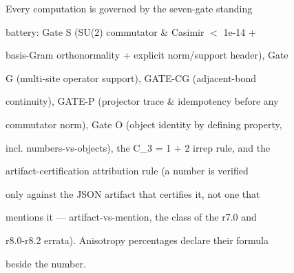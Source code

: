 \documentclass[11pt,a4paper]{article}
\theoremstyle{definition}
\begin{document}
Every computation is governed by the seven-gate standing

battery: Gate S (SU(2) commutator \& Casimir $<$ 1e-14 +

basis-Gram orthonormality + explicit norm/support header), Gate

G (multi-site operator support), GATE-CG (adjacent-bond

continuity), GATE-P (projector trace \& idempotency before any

commutator norm), Gate O (object identity by defining property,

incl. numbers-vs-objects), the C\_3 = 1 + 2 irrep rule, and the

artifact-certification attribution rule (a number is verified

only against the JSON artifact that certifies it, not one that

mentions it — artifact-vs-mention, the class of the r7.0 and

r8.0-r8.2 errata). Anisotropy percentages declare their formula

beside the number.
\end{document}
